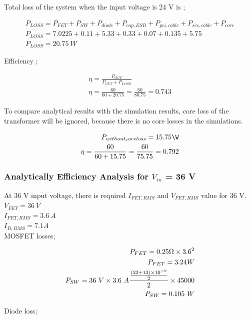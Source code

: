  Total loss of the system when the input voltage is 24 V is ;
 
 \begin{align}
    P_{LOSS}= P_{FET} + P_{SW} + P_{diode} + P_{cap,ESR} + P_{pri,cable} + P_{sec,cable} + P_{core} \\
    P_{LOSS} = 7.0225 + 0.11 + 5.33 + 0.33 + 0.07 + 0.135 + 5.75 \\
    P_{LOSS} = 20.75\ W 
 \end{align}
 
 Efficiency ;
 
 \begin{align}
     \eta = \frac{P_{OUT}}{P_{OUT}+P_{LOSS}}\\
     \eta = \frac{60}{60+20.75} = \frac{60}{80.75} = 0.743 
 \end{align}
 
 To compare analytical results with the simulation results, core loss of the transformer will be ignored, because there is no core losses in the simulations. 
 
 \begin{align}
     P_{without_coreloss} = 15.75\W \\
     \eta = \frac{60}{60+15.75} = \frac{60}{75.75} = 0.792 
 \end{align}
 
 
 \subsubsection{Analytically Efficiency Analysis for $V_{in}$ = 36 V }

At 36 V input voltage, there is required $I_{FET,RMS}$ and $V_{FET,RMS}$ value for 36 V.\\

$V_{FET} = 36\ V$\\
$I_{FET,RMS}= 3.6\ A$\\
$I_{D,RMS} = 7.1 A $\\

MOSFET losses;

\begin{align}
     P_{FET} = 0.25 \ohm \times 3.6^2\\
     P_{FET} = 3.24 W \\
     P_{SW} = 36\ V\times 3.6\ A \frac{\frac{(23+13)\times 10^{-9}}{2}}{2}\times 45000 \\
     P_{SW} = 0.105\ W
\end{align}

Diode loss;

